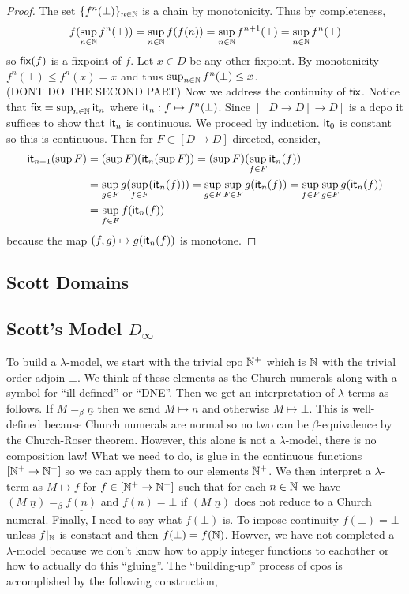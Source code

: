 \documentclass[12pt]{article}
\begin{document}
\begin{proof}
The set $\{ f^n(\bot) \}_{n \in \N}$ is a chain by monotonicity. Thus by completeness,
\[ f(\sup_{n \in \N} f^n(\bot)) = \sup_{n \in \N} f(f(n)) = \sup_{n \in \N} f^{n+1}(\bot) = \sup_{n \in \N} f^n(\bot) \]
so $\fix(f)$ is a fixpoint of $f$. Let $x \in D$ be any other fixpoint. By monotonicity $f^n(\bot) \le f^n(x) = x$ and thus $\sup_{n \in \N} f^n(\bot) \le x$.
\bigskip\\
(DONT DO THE SECOND PART)
Now we address the continuity of $\fix$. Notice that $\fix = \sup_{n \in \N} \it_n$ where $\it_n : f \mapsto f^n(\bot)$. Since $[[D \to D] \to D]$ is a dcpo it suffices to show that $\it_n$ is continuous. We proceed by induction. $\it_0$ is constant so this is continuous. Then for $F \subset [D \to D]$ directed, consider,
\begin{align*}
\it_{n+1}(\sup F) & = (\sup F)(\it_n(\sup F)) = (\sup F)(\sup_{f \in F} \it_n(f)) 
\\
& = \sup_{g \in F} g (\sup_{f \in F}(\it_n(f))) = \sup_{g \in F} \sup_{F \in F} g(\it_n(f)) = \sup_{f \in F} \sup_{g \in F} g(\it_n(f))
\\
& = \sup_{f \in F} f(\it_n(f)) 
\end{align*}
because the map $(f, g) \mapsto g(\it_n(f))$ is monotone. 
\end{proof}

\subsection{Scott Domains}

\subsection{Scott's Model $D_{\infty}$}

To build a $\lambda$-model, we start with the trivial cpo $\N^+$ which is $\N$ with the trivial order adjoin $\bot$. We think of these elements as the Church numerals along with a symbol for ``ill-defined'' or ``DNE''. Then we get an interpretation of $\lambda$-terms as follows. If $M =_\beta \underline{n}$ then we send $M \mapsto n$ and otherwise $M \mapsto \bot$. This is well-defined because Church numerals are normal so no two can be $\beta$-equivalence by the Church-Roser theorem. However, this alone is not a $\lambda$-model, there is no composition law! What we need to do, is glue in the continuous functions $[\N^+ \to \N^+]$ so we can apply them to our elements $\N^+$. We then interpret a $\lambda$-term as $M \mapsto f$ for $f \in [\N^+ \to \N^+]$ such that for each $n \in \N$ we have $(M \; \underline{n}) =_\beta \underline{f(n)}$ and $f(n) = \bot$ if $(M \; \underline{n})$ does not reduce to a Church numeral. Finally, I need to say what $f(\bot)$ is. To impose continuity $f(\bot) = \bot$ unless $f|_{\N}$ is constant and then $f(\bot) = f(\N)$. Howver, we have not completed a $\lambda$-model because we don't know how to apply integer functions to eachother or how to actually do this ``gluing''. The ``building-up'' process of cpos is accomplished by the following construction,
\end{document}
